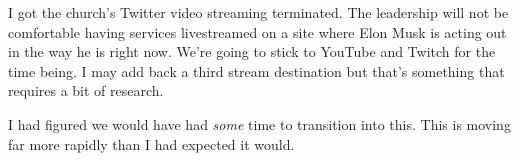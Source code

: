 I got the church's Twitter video streaming terminated. The leadership
will not be comfortable having services livestreamed on a site where
Elon Musk is acting out in the way he is right now. We're going to stick
to YouTube and Twitch for the time being. I may add back a third stream
destination but that's something that requires a bit of research.

I had figured we would have had \emph{some} time to transition into
this. This is moving far more rapidly than I had expected it would.
